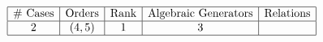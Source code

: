 \begin{table}[h]
	\centering
	$\begin{array}{|c|c|c|c|c|}
		\hline
		\text{\# Cases} & \text{Orders} & \text{Rank} & \text{Algebraic Generators} & \text{Relations} \\
		\hline
		2 & (4, 5) & 1 & 3 &  \\
		\hline
	\end{array}$
\end{table}
